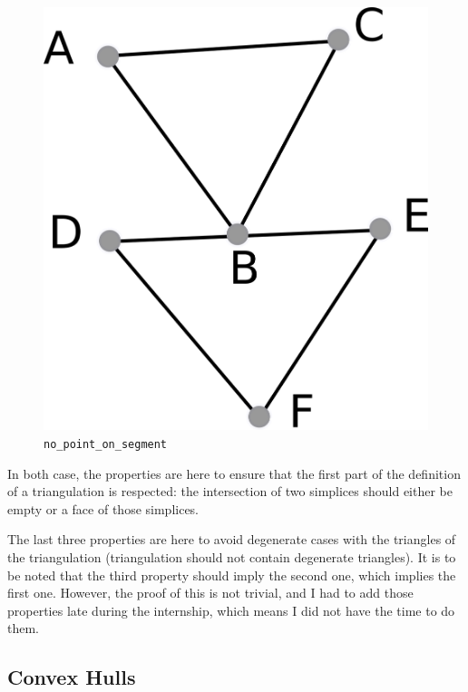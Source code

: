 \documentclass[a4paper,10pt]{article}
\begin{document}
\begin{enumerate}
\begin{figure}
\includegraphics[scale=2]{nps}
\caption{\label{nps} {\tt no\_point\_on\_segment}}
\end{figure}
\end{enumerate}
In both case, the properties are here to ensure that the first part of the definition of a triangulation is respected: the intersection of two simplices should either be empty or a face of those simplices.

The last three properties are here to avoid degenerate cases with the triangles of the triangulation (triangulation should not contain degenerate triangles). It is to be noted that the third property should imply the second one, which implies the first one. However, the proof of this is not trivial, and I had to add those properties late during the internship, which means I did not have the time to do them.

\subsection{Convex Hulls}
\end{document}

